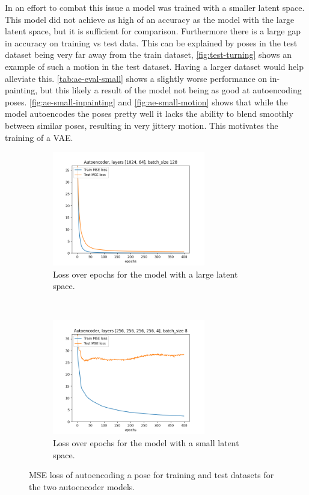 In an effort to combat this issue a model was trained with a smaller latent space. This model did not achieve as high of an accuracy as the model with the large latent space, but it is sufficient for comparison. Furthermore there is a large gap in accuracy on training vs test data. This can be explained by poses in the test dataset being very far away from the train dataset, \autoref{fig:test-turning} shows an example of such a motion in the test dataset. Having a larger dataset would help alleviate this. \autoref{tab:ae-eval-small} shows a slightly worse performance on in-painting, but this likely a result of the model not being as good at autoencoding poses. \autoref{fig:ae-small-inpainting} and \autoref{fig:ae-small-motion} shows that while the model autoencodes the poses pretty well it lacks the ability to blend smoothly between similar poses, resulting in very jittery motion. This motivates the training of a VAE.





\begin{figure}[h]
    \centering
    \begin{subfigure}[t]{0.5\textwidth}
        \centering
        \includegraphics[height=5cm]{img/simple_1024-64_batch-128_losses}
        \caption{Loss over epochs for the model with a large latent space.}
    \label{fig:ae-loss-large}
    \end{subfigure}%
    ~
    \begin{subfigure}[t]{0.5\textwidth}
        \centering
        \includegraphics[height=5cm]{img/simple_256-256-256-256-4_batch-8_losses}
        \caption{Loss over epochs for the model with a small latent space.}
    \label{fig:ae-loss-small}
    \end{subfigure}
    \caption{MSE loss of autoencoding a pose for training and test datasets for the two autoencoder models.}
\end{figure}


